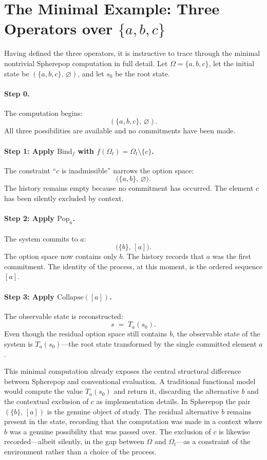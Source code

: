 \documentclass[12pt]{article}
\begin{document}
\section{The Minimal Example: Three Operators over $\{a, b, c\}$}
\label{sec:example}

Having defined the three operators, it is instructive to trace through the minimal nontrivial Spherepop computation in full detail. Let $\Omega = \{a, b, c\}$, let the initial state be $(\{a,b,c\},\, \varnothing)$, and let $s_0$ be the root state.

\paragraph{Step 0.} The computation begins:
\[
(\{a,b,c\},\, \varnothing).
\]
All three possibilities are available and no commitments have been made.

\paragraph{Step 1: Apply $\mathrm{Bind}_f$ with $f(\Omega_t) = \Omega_t \setminus \{c\}$.}

The constraint ``$c$ is inadmissible'' narrows the option space:
\[
\bigl(\{a,b\},\, \varnothing\bigr).
\]
The history remains empty because no commitment has occurred. The element $c$ has been silently excluded by context.

\paragraph{Step 2: Apply $\mathrm{Pop}_a$.}

The system commits to $a$:
\[
\bigl(\{b\},\, [a]\bigr).
\]
The option space now contains only $b$. The history records that $a$ was the first commitment. The identity of the process, at this moment, is the ordered sequence $[a]$.

\paragraph{Step 3: Apply $\mathrm{Collapse}([a])$.}

The observable state is reconstructed:
\[
s \;=\; T_a(s_0).
\]
Even though the residual option space still contains $b$, the observable state of the system is $T_a(s_0)$---the root state transformed by the single committed element $a$.

This minimal computation already exposes the central structural difference between Spherepop and conventional evaluation. A traditional functional model would compute the value $T_a(s_0)$ and return it, discarding the alternative $b$ and the contextual exclusion of $c$ as implementation details. In Spherepop the pair $(\{b\},\, [a])$ is the genuine object of study. The residual alternative $b$ remains present in the state, recording that the computation was made in a context where $b$ was a genuine possibility that was passed over. The exclusion of $c$ is likewise recorded---albeit silently, in the gap between $\Omega$ and $\Omega_t$---as a constraint of the environment rather than a choice of the process.
\end{document}
